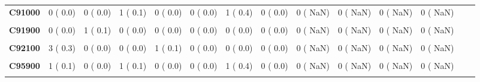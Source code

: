 \documentclass[
]{article}
\begin{document}
\begin{table}[H]
\begin{tabular}[t]{>{\raggedright\arraybackslash}p{5em}ccccccccccccc}
\textbf{C91000} & 0 (  0.0) & 0 (  0.0) & 1 (  0.1) & 0 (  0.0) & 0 (  0.0) & 1 (  0.4) & 0 (  0.0) & 0 (  NaN) & 0 (  NaN) & 0 (  NaN) & 0 (  NaN) &  & \\
\textbf{\cellcolor{gray!10}{C91100}} & \cellcolor{gray!10}{2 (  0.2)} & \cellcolor{gray!10}{2 (  0.2)} & \cellcolor{gray!10}{3 (  0.3)} & \cellcolor{gray!10}{0 (  0.0)} & \cellcolor{gray!10}{0 (  0.0)} & \cellcolor{gray!10}{0 (  0.0)} & \cellcolor{gray!10}{0 (  0.0)} & \cellcolor{gray!10}{0 (  NaN)} & \cellcolor{gray!10}{0 (  NaN)} & \cellcolor{gray!10}{0 (  NaN)} & \cellcolor{gray!10}{0 (  NaN)} & \cellcolor{gray!10}{} & \cellcolor{gray!10}{}\\
\textbf{C91900} & 0 (  0.0) & 1 (  0.1) & 0 (  0.0) & 0 (  0.0) & 0 (  0.0) & 0 (  0.0) & 0 (  0.0) & 0 (  NaN) & 0 (  NaN) & 0 (  NaN) & 0 (  NaN) &  & \\
\textbf{\cellcolor{gray!10}{C92000}} & \cellcolor{gray!10}{5 (  0.5)} & \cellcolor{gray!10}{3 (  0.3)} & \cellcolor{gray!10}{2 (  0.2)} & \cellcolor{gray!10}{2 (  0.3)} & \cellcolor{gray!10}{0 (  0.0)} & \cellcolor{gray!10}{0 (  0.0)} & \cellcolor{gray!10}{0 (  0.0)} & \cellcolor{gray!10}{0 (  NaN)} & \cellcolor{gray!10}{0 (  NaN)} & \cellcolor{gray!10}{0 (  NaN)} & \cellcolor{gray!10}{0 (  NaN)} & \cellcolor{gray!10}{} & \cellcolor{gray!10}{}\\
\textbf{C92100} & 3 (  0.3) & 0 (  0.0) & 0 (  0.0) & 1 (  0.1) & 0 (  0.0) & 0 (  0.0) & 0 (  0.0) & 0 (  NaN) & 0 (  NaN) & 0 (  NaN) & 0 (  NaN) &  & \\
\textbf{\cellcolor{gray!10}{C95000}} & \cellcolor{gray!10}{0 (  0.0)} & \cellcolor{gray!10}{1 (  0.1)} & \cellcolor{gray!10}{0 (  0.0)} & \cellcolor{gray!10}{0 (  0.0)} & \cellcolor{gray!10}{0 (  0.0)} & \cellcolor{gray!10}{0 (  0.0)} & \cellcolor{gray!10}{0 (  0.0)} & \cellcolor{gray!10}{0 (  NaN)} & \cellcolor{gray!10}{0 (  NaN)} & \cellcolor{gray!10}{0 (  NaN)} & \cellcolor{gray!10}{0 (  NaN)} & \cellcolor{gray!10}{} & \cellcolor{gray!10}{}\\
\textbf{C95900} & 1 (  0.1) & 0 (  0.0) & 1 (  0.1) & 0 (  0.0) & 0 (  0.0) & 1 (  0.4) & 0 (  0.0) & 0 (  NaN) & 0 (  NaN) & 0 (  NaN) & 0 (  NaN) &  & \\
\textbf{\cellcolor{gray!10}{C96100}} & \cellcolor{gray!10}{1 (  0.1)} & \cellcolor{gray!10}{0 (  0.0)} & \cellcolor{gray!10}{0 (  0.0)} & \cellcolor{gray!10}{0 (  0.0)} & \cellcolor{gray!10}{0 (  0.0)} & \cellcolor{gray!10}{0 (  0.0)} & \cellcolor{gray!10}{0 (  0.0)} & \cellcolor{gray!10}{0 (  NaN)} & \cellcolor{gray!10}{0 (  NaN)} & \cellcolor{gray!10}{0 (  NaN)} & \cellcolor{gray!10}{0 (  NaN)} & \cellcolor{gray!10}{} & \cellcolor{gray!10}{}\\

\end{tabular}
\end{table}
\end{document}
